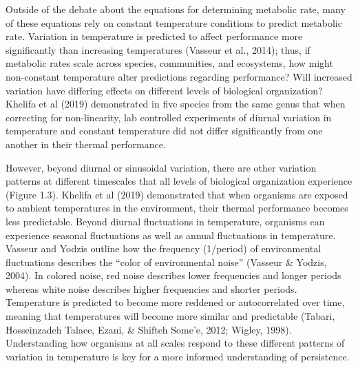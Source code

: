 \documentclass[12pt,twoside]{reedthesis}
\begin{document}
Outside of the debate about the equations for determining metabolic rate, many of these equations rely on constant temperature conditions to predict metabolic rate. Variation in temperature is predicted to affect performance more significantly than increasing temperatures (Vasseur et al., 2014); thus, if metabolic rates scale across species, communities, and ecosystems, how might non-constant temperature alter predictions regarding performance? Will increased variation have differing effects on different levels of biological organization? Khelifa et al (2019) demonstrated in five species from the same genus that when correcting for non-linearity, lab controlled experiments of diurnal variation in temperature and constant temperature did not differ significantly from one another in their thermal performance.

However, beyond diurnal or sinusoidal variation, there are other variation patterns at different timescales that all levels of biological organization experience (Figure 1.3). Khelifa et al (2019) demonstrated that when organisms are exposed to ambient temperatures in the environment, their thermal performance becomes less predictable. Beyond diurnal fluctuations in temperature, organisms can experience seasonal fluctuations as well as annual fluctuations in temperature. Vasseur and Yodzis outline how the frequency (1/period) of environmental fluctuations describes the ``color of environmental noise'' (Vasseur \& Yodzis, 2004). In colored noise, red noise describes lower frequencies and longer periods whereas white noise describes higher frequencies and shorter periods. Temperature is predicted to become more reddened or autocorrelated over time, meaning that temperatures will become more similar and predictable (Tabari, Hosseinzadeh Talaee, Ezani, \& Shifteh Some'e, 2012; Wigley, 1998). Understanding how organisms at all scales respond to these different patterns of variation in temperature is key for a more informed understanding of persistence.
\end{document}
